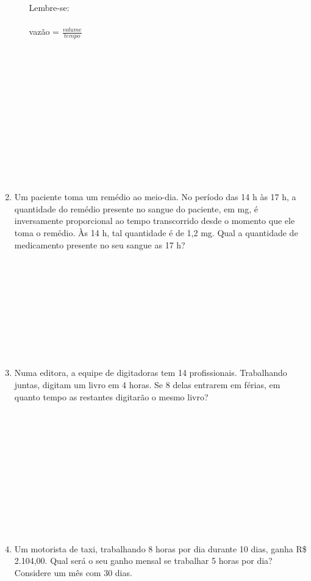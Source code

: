 \documentclass[a4paper,14pt]{article}
\begin{document}
\begin{multicols}{2}
\begin{enumerate}
\begin{enumerate}[a)]
    	    	Lembre-se: \\\\vazão = $\frac{volume}{tempo}$
    	    	 \\\\\\\\\\\\\\\\\\\\\\\\\\
    	    \end{enumerate}	
            \item Um paciente toma um remédio ao meio-dia. No período das 14 h às 17 h, a quantidade do remédio presente no sangue do paciente, em mg, é inversamente proporcional ao tempo transcorrido desde o momento que ele toma o remédio. Às 14 h, tal quantidade é de 1,2 mg. Qual a quantidade de medicamento presente no seu sangue as 17 h? \\\\\\\\\\\\\\\\\\\\
            \item Numa editora, a equipe de digitadoras tem 14 profissionais. Trabalhando juntas, digitam um livro em 4 horas. Se 8 delas entrarem em férias, em quanto tempo as restantes digitarão o mesmo livro? \\\\\\\\\\\\\\\\\\\\\\\\
            \item Um motorista de taxi, trabalhando 8 horas por dia durante 10 dias, ganha R\$ 2.104,00. Qual será o seu ganho mensal se trabalhar 5 horas por dia? Considere um mês com 30 dias.
            \begin{enumerate}[a)]

\end{enumerate}
\end{enumerate}
\end{multicols}
\end{document}
